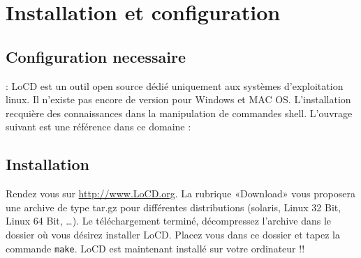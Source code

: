 \chapter{Installation et configuration}

\section{Configuration necessaire}
\label{sec:conf}
\danger : LoCD est un outil open source dédié uniquement aux systèmes d'exploitation linux. Il n'existe pas encore de version pour Windows et MAC OS. L'installation recquière des connaissances dans la manipulation de commandes shell. L'ouvrage suivant est une référence dans ce domaine : \cite{Nutshell}    

\section{Installation}
\label{sec:install}
Rendez vous sur \url{http://www.LoCD.org}. La rubrique «Download» vous proposera une archive de type tar.gz pour différentes distributions (solaris, Linux 32 Bit, Linux 64 Bit, \dots ). Le téléchargement terminé, décompressez l'archive dans le dossier où vous désirez installer LoCD. Placez vous dans ce dossier et tapez la commande \verb+make+. LoCD est maintenant installé sur votre ordinateur \smiley !!  


